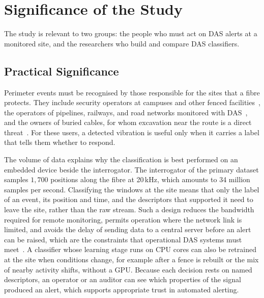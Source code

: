 \section{Significance of the Study}
\label{sec:SignificanceOfTheStudy}
The study is relevant to two groups: the people who must act on DAS alerts at a monitored site, and the researchers who build and compare DAS classifiers.

\subsection{Practical Significance}
\label{sec:PracticalApplications}
Perimeter events must be recognised by those responsible for the sites that a fibre protects. They include security operators at campuses and other fenced facilities~\cite{tomasov2025perimeter}, the operators of pipelines, railways, and road networks monitored with DAS~\cite{wu2024pipeline,yurekli2025railway,deng2025roadtraffic}, and the owners of buried cables, for whom excavation near the route is a direct threat~\cite{bublin2021event}. For these users, a detected vibration is useful only when it carries a label that tells them whether to respond.

The volume of data explains why the classification is best performed on an embedded device beside the interrogator. The interrogator of the primary dataset samples $1{,}700$ positions along the fibre at 20\,kHz, which amounts to 34 million samples per second. Classifying the windows at the site means that only the label of an event, its position and time, and the descriptors that supported it need to leave the site, rather than the raw stream. Such a design reduces the bandwidth required for remote monitoring, permits operation where the network link is limited, and avoids the delay of sending data to a central server before an alert can be raised, which are the constraints that operational DAS systems must meet~\cite{deng2025roadtraffic}. A classifier whose learning stage runs on CPU cores can also be retrained at the site when conditions change, for example after a fence is rebuilt or the mix of nearby activity shifts, without a GPU. Because each decision rests on named descriptors, an operator or an auditor can see which properties of the signal produced an alert, which supports appropriate trust in automated alerting.

